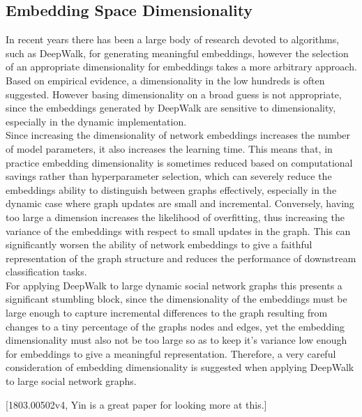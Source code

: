 \documentclass[a4paper]{article}
\begin{document}
\subsection{Embedding Space Dimensionality}
In recent years there has been a large body of research devoted to algorithms, such as DeepWalk, for generating meaningful embeddings, however the selection of an appropriate dimensionality for embeddings
takes a more arbitrary approach. Based on empirical evidence, a dimensionality in the low hundreds is often suggested\cite{bradford2008}. However basing dimensionality on a broad guess is not appropriate, since the embeddings generated by DeepWalk are sensitive to dimensionality, especially in the dynamic implementation.\\
Since increasing the dimensionality of network embeddings increases the number of model parameters, it also increases the learning time. This means that,
in practice embedding dimensionality is sometimes reduced based on computational savings rather than hyperparameter selection, which can severely reduce the embeddings ability to
distinguish between graphs effectively, especially in the dynamic case where graph updates are small and incremental.
Conversely, having too large a dimension increases the likelihood of overfitting, thus increasing the variance of the embeddings with respect to small updates in the graph. This can significantly
worsen the ability of network embeddings to give a faithful representation of the graph structure and reduces the performance of downstream classification
tasks.\\
For applying DeepWalk to large dynamic social network graphs this presents a significant stumbling block, since the dimensionality of the embeddings must be large enough to capture incremental differences
to the graph resulting from changes to a tiny percentage of the graphs nodes and edges, yet the embedding dimensionality must also not be too large so as to keep it's variance low enough for embeddings to
give a meaningful representation. Therefore, a very careful consideration of embedding dimensionality is suggested when applying DeepWalk to large social network graphs.


[1803.00502v4, Yin is a great paper for looking more at this.]
\end{document}
